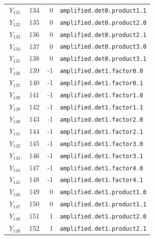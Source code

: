 {\begin{longtable}{@{}r r r p{0.64\linewidth}@{}}
\(Y_{131}\) & 134 & 0 & \texttt{amplified.\allowbreak{}det0.\allowbreak{}product1.\allowbreak{}1} \\
\(Y_{132}\) & 135 & 0 & \texttt{amplified.\allowbreak{}det0.\allowbreak{}product2.\allowbreak{}0} \\
\(Y_{133}\) & 136 & 0 & \texttt{amplified.\allowbreak{}det0.\allowbreak{}product2.\allowbreak{}1} \\
\(Y_{134}\) & 137 & 0 & \texttt{amplified.\allowbreak{}det0.\allowbreak{}product3.\allowbreak{}0} \\
\(Y_{135}\) & 138 & 0 & \texttt{amplified.\allowbreak{}det0.\allowbreak{}product3.\allowbreak{}1} \\
\(Y_{136}\) & 139 & -1 & \texttt{amplified.\allowbreak{}det1.\allowbreak{}factor0.\allowbreak{}0} \\
\(Y_{137}\) & 140 & -1 & \texttt{amplified.\allowbreak{}det1.\allowbreak{}factor0.\allowbreak{}1} \\
\(Y_{138}\) & 141 & -1 & \texttt{amplified.\allowbreak{}det1.\allowbreak{}factor1.\allowbreak{}0} \\
\(Y_{139}\) & 142 & -1 & \texttt{amplified.\allowbreak{}det1.\allowbreak{}factor1.\allowbreak{}1} \\
\(Y_{140}\) & 143 & -1 & \texttt{amplified.\allowbreak{}det1.\allowbreak{}factor2.\allowbreak{}0} \\
\(Y_{141}\) & 144 & -1 & \texttt{amplified.\allowbreak{}det1.\allowbreak{}factor2.\allowbreak{}1} \\
\(Y_{142}\) & 145 & -1 & \texttt{amplified.\allowbreak{}det1.\allowbreak{}factor3.\allowbreak{}0} \\
\(Y_{143}\) & 146 & -1 & \texttt{amplified.\allowbreak{}det1.\allowbreak{}factor3.\allowbreak{}1} \\
\(Y_{144}\) & 147 & -1 & \texttt{amplified.\allowbreak{}det1.\allowbreak{}factor4.\allowbreak{}0} \\
\(Y_{145}\) & 148 & -1 & \texttt{amplified.\allowbreak{}det1.\allowbreak{}factor4.\allowbreak{}1} \\
\(Y_{146}\) & 149 & 0 & \texttt{amplified.\allowbreak{}det1.\allowbreak{}product1.\allowbreak{}0} \\
\(Y_{147}\) & 150 & 0 & \texttt{amplified.\allowbreak{}det1.\allowbreak{}product1.\allowbreak{}1} \\
\(Y_{148}\) & 151 & 1 & \texttt{amplified.\allowbreak{}det1.\allowbreak{}product2.\allowbreak{}0} \\
\(Y_{149}\) & 152 & 1 & \texttt{amplified.\allowbreak{}det1.\allowbreak{}product2.\allowbreak{}1} \\

\end{longtable}}
